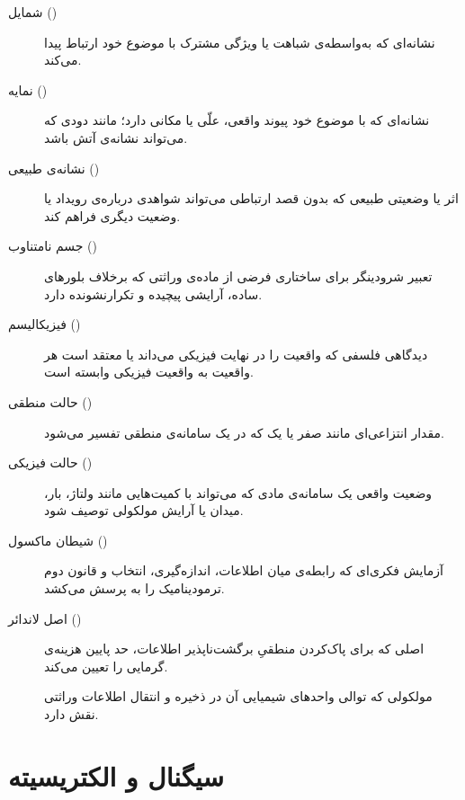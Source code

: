 \begin{description}
  \item[شمایل ()] نشانه‌ای که به‌واسطه‌ی شباهت یا ویژگی مشترک با موضوع خود ارتباط پیدا می‌کند.
  \item[نمایه ()] نشانه‌ای که با موضوع خود پیوند واقعی، علّی یا مکانی دارد؛ مانند دودی که می‌تواند نشانه‌ی آتش باشد.
  \item[نشانه‌ی طبیعی ()] اثر یا وضعیتی طبیعی که بدون قصد ارتباطی می‌تواند شواهدی درباره‌ی رویداد یا وضعیت دیگری فراهم کند.
  \item[جسم نامتناوب ()] تعبیر شرودینگر برای ساختاری فرضی از ماده‌ی وراثتی که برخلاف بلورهای ساده، آرایشی پیچیده و تکرارنشونده دارد.
  \item[فیزیکالیسم ()] دیدگاهی فلسفی که واقعیت را در نهایت فیزیکی می‌داند یا معتقد است هر واقعیت به واقعیت فیزیکی وابسته است.
  \item[حالت منطقی ()] مقدار انتزاعی‌ای مانند صفر یا یک که در یک سامانه‌ی منطقی تفسیر می‌شود.
  \item[حالت فیزیکی ()] وضعیت واقعی یک سامانه‌ی مادی که می‌تواند با کمیت‌هایی مانند ولتاژ، بار، میدان یا آرایش مولکولی توصیف شود.
  \item[شیطان ماکسول ()] آزمایش فکری‌ای که رابطه‌ی میان اطلاعات، اندازه‌گیری، انتخاب و قانون دوم ترمودینامیک را به پرسش می‌کشد.
  \item[اصل لاندائر ()] اصلی که برای پاک‌کردن منطقیِ برگشت‌ناپذیر اطلاعات، حد پایین هزینه‌ی گرمایی را تعیین می‌کند.
  \item[] مولکولی که توالی واحدهای شیمیایی آن در ذخیره و انتقال اطلاعات وراثتی نقش دارد.
\end{description}

\section*{سیگنال و الکتریسیته}

